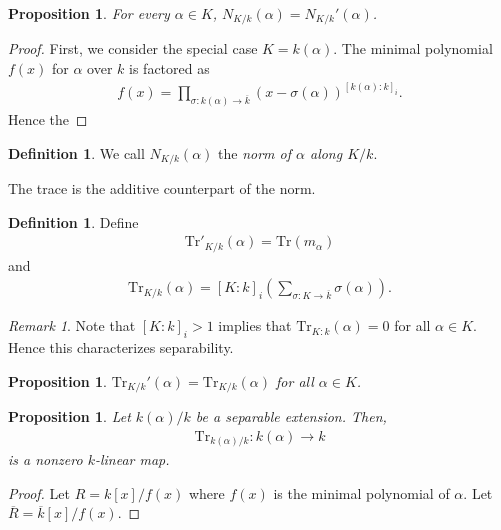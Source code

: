\documentclass[12pt]{report}
\theoremstyle{plain}
\newtheorem{proposition}[theorem]{Proposition}
\theoremstyle{remark}
\newtheorem*{remark}{Remark}
\theoremstyle{definition}
\newtheorem{definition}[theorem]{Definition}
\begin{document}
\begin{proposition}
    For every $\alpha\in K$, $N_{K/k}(\alpha)=N_{K/k}'(\alpha)$.
\end{proposition}
\begin{proof}
    First, we consider the special case $K=k(\alpha)$. The minimal polynomial $f(x)$ for $\alpha$ over $k$ is factored as
    \begin{align*}
        f(x) = \prod_{\sigma:k(\alpha)\rightarrow \overline{k}}(x-\sigma(\alpha))^{[k(\alpha):k]_i}.
    \end{align*}
    Hence the 
\end{proof}

\begin{definition}
    We call $N_{K/k}(\alpha)$ the \emph{norm of $\alpha$ along $K/k$}.
\end{definition}

The trace is the additive counterpart of the norm.

\begin{definition}
    Define
    \begin{align*}
        \mathrm{Tr}'_{K/k}(\alpha) = \mathrm{Tr}(m_\alpha)
    \end{align*}
    and
    \begin{align*}
        \mathrm{Tr}_{K/k}(\alpha) = [K:k]_i\left( \sum_{\sigma:K\rightarrow\overline{k}} \sigma(\alpha) \right).
    \end{align*}
\end{definition}
\begin{remark}
    Note that $[K:k]_i>1$ implies that $\mathrm{Tr}_{K:k}(\alpha)=0$ for all $\alpha\in K$. Hence this characterizes separability.
\end{remark}

\begin{proposition}
    $\mathrm{Tr}_{K/k}'(\alpha) = \mathrm{Tr}_{K/k}(\alpha)$ for all $\alpha\in K$.
\end{proposition}

\begin{proposition}
    Let $k(\alpha)/k$ be a separable extension. Then, 
    \begin{align*}
        \mathrm{Tr}_{k(\alpha)/k}:k(\alpha)\rightarrow k
    \end{align*}
    is a nonzero $k$-linear map.
\end{proposition}
\begin{proof}
    Let $R=k[x]/f(x)$ where $f(x)$ is the minimal polynomial of $\alpha$. Let $\overline{R}=\overline{k}[x]/f(x)$. 
\end{proof}
\end{document}

